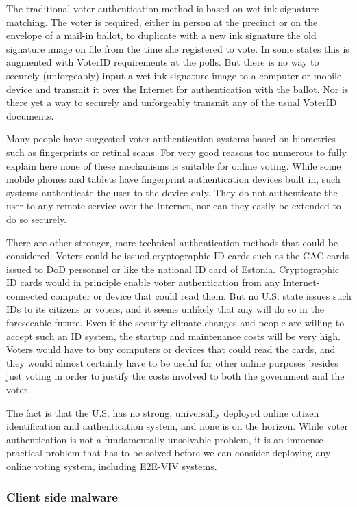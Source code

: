 The traditional voter authentication method is based on wet ink
signature matching. The voter is required, either in person at the
precinct or on the envelope of a mail-in ballot, to duplicate with a
new ink signature the old signature image on file from the time she
registered to vote. In some states this is augmented with VoterID
requirements at the polls. But there is no way to securely
(unforgeably) input a wet ink signature image to a computer or mobile
device and transmit it over the Internet for authentication with the
ballot. Nor is there yet a way to securely and unforgeably transmit
any of the usual VoterID documents.

Many people have suggested voter authentication systems based on
biometrics such as fingerprints or retinal scans. For very good
reasons too numerous to fully explain here none of these mechanisms is
suitable for online voting. While some mobile phones and tablets have
fingerprint authentication devices built in, such systems authenticate
the user to the device only. They do not authenticate the user to any
remote service over the Internet, nor can they easily be extended to
do so securely.

There are other stronger, more technical authentication methods that
could be considered.  Voters could be issued cryptographic ID cards
such as the CAC cards issued to DoD personnel or like the national ID
card of Estonia. Cryptographic ID cards would in principle enable
voter authentication from any Internet-connected computer or device
that could read them. But no U.S. state issues such IDs to its
citizens or voters, and it seems unlikely that any will do so in the
foreseeable future. Even if the security climate changes and people
are willing to accept such an ID system, the startup and maintenance
costs will be very high.  Voters would have to buy computers or
devices that could read the cards, and they would almost certainly
have to be useful for other online purposes besides just voting in
order to justify the costs involved to both the government and the
voter.

The fact is that the U.S. has no strong, universally deployed online
citizen identification and authentication system, and none is on the
horizon. While voter authentication is not a fundamentally unsolvable
problem, it is an immense practical problem that has to be solved
before we can consider deploying any online voting system, including
E2E-VIV systems.

\subsubsection{Client side malware}


